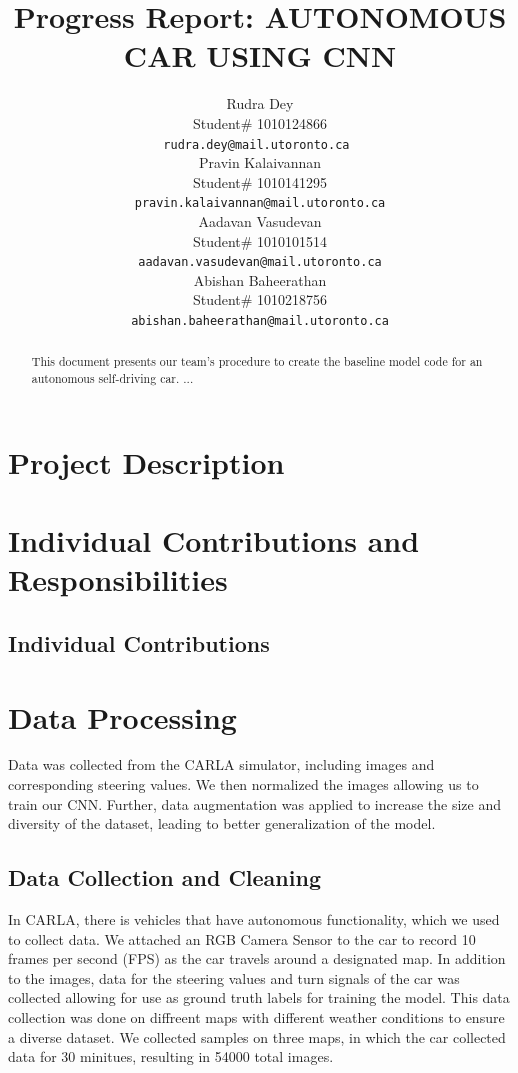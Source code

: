 \documentclass{article} %
\title{Progress Report: AUTONOMOUS CAR USING CNN\\}
\author{Rudra Dey  \\
Student\# 1010124866\\
\texttt{rudra.dey@mail.utoronto.ca } \\
\And
Pravin Kalaivannan  \\
Student\# 1010141295 \\ 
\texttt{pravin.kalaivannan@mail.utoronto.ca} \\
\AND
Aadavan Vasudevan  \\
Student\# 1010101514 \\
\texttt{aadavan.vasudevan@mail.utoronto.ca} \\
\And
Abishan Baheerathan \\
Student\# 1010218756 \\
\texttt{abishan.baheerathan@mail.utoronto.ca} \\
\AND
}
\begin{document}
\maketitle

\begin{abstract}
This document presents our team's procedure to create the baseline model
code for an autonomous self-driving car. ...\\

\end{abstract}

\section{Project Description}

\section{Individual Contributions and Responsibilities}

\subsection{Individual Contributions}

\section{Data Processing}

Data was collected from the CARLA simulator, including images and corresponding steering values. We then normalized the images allowing us to train our CNN.
Further, data augmentation was applied to increase the size and diversity of the dataset, leading to better generalization of the model.


\subsection{Data Collection and Cleaning}

In CARLA, there is vehicles that have autonomous functionality, which we used to collect data.
We attached an RGB Camera Sensor to the car to record 10 frames per second (FPS) as the car
travels around a designated map. In addition to the images, data for the steering values and turn signals of the car
was collected allowing for use as ground truth labels for training the model. This data collection was done on diffreent maps with different weather conditions
to ensure a diverse dataset. We collected samples on three maps, in which the car collected data for 30 minitues, resulting in 54000 total images.
\end{document}
